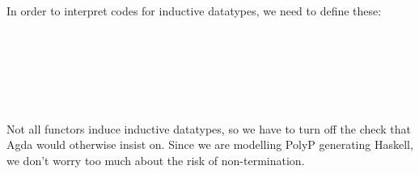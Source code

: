 \documentclass[fleqn,runningheads]{llncs}
\begin{document}
In order to interpret codes for inductive datatypes, we need to define these:
\begin{code}%
\>[0]\AgdaSymbol{\{-\#}\AgdaSpace{}%
\AgdaSpace{}%
\AgdaSymbol{\#-\}}\<%
\\
\>[0]\AgdaSpace{}%
\AgdaSpace{}%
\AgdaSymbol{(}\AgdaSpace{}%
\AgdaSymbol{:}\AgdaSpace{}%
\AgdaSpace{}%
\AgdaSpace{}%
\AgdaSymbol{)}\AgdaSpace{}%
\AgdaSymbol{:}\AgdaSpace{}%
\AgdaSpace{}%
\<%
\\
\>[0][@{}l@{\AgdaIndent{0}}]%
\>[2]\AgdaSpace{}%
\AgdaSymbol{:}\AgdaSpace{}%
\AgdaSpace{}%
\AgdaSymbol{(}\AgdaSpace{}%
\AgdaSymbol{)}\AgdaSpace{}%
\AgdaSpace{}%
\AgdaSpace{}%
\<%
\\
%
\\[\AgdaEmptyExtraSkip]%
\>[0]\AgdaSpace{}%
\AgdaSymbol{:}\AgdaSpace{}%
\AgdaSymbol{\{}\AgdaSpace{}%
\AgdaSpace{}%
\AgdaSymbol{:}\AgdaSpace{}%
\AgdaSpace{}%
\AgdaSpace{}%
\AgdaSpace{}%
\AgdaSymbol{\}}\AgdaSpace{}%
\AgdaSpace{}%
\AgdaSpace{}%
\AgdaSpace{}%
\AgdaSpace{}%
\AgdaSpace{}%
\AgdaSymbol{(}\AgdaSpace{}%
\AgdaSymbol{)}\<%
\\
\>[0]\AgdaSpace{}%
\AgdaSymbol{(}\AgdaSpace{}%
\AgdaSymbol{)}\AgdaSpace{}%
\AgdaSymbol{=}\AgdaSpace{}%
\<%
\end{code}
Not all functors induce inductive datatypes, so we have to turn off the check that Agda would otherwise insist on. Since we are modelling PolyP generating Haskell, we don't worry too much about the risk of non-termination.
\end{document}
